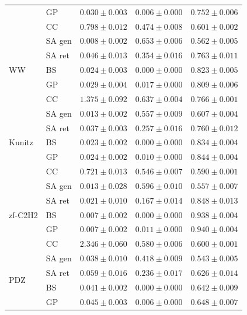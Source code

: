 \begin{table}[ht]
\begin{tabular}{@{}llccc@{}}
 & GP      & $\mathbf{0.030 \pm 0.003}$ & $0.006 \pm 0.000$ & $0.752 \pm 0.006$ \\
 & CC      & $0.798 \pm 0.012$ & $0.474 \pm 0.008$ & $0.601 \pm 0.002$ \\
\midrule
\multirow{5}{*}{WW}
 & SA gen  & $\mathbf{0.008 \pm 0.002}$ & $\mathbf{0.653 \pm 0.006}$ & $\mathbf{0.562 \pm 0.005}$ \\
 & SA ret  & $0.046 \pm 0.013$ & $0.354 \pm 0.016$ & $0.763 \pm 0.011$ \\
 & BS      & $0.024 \pm 0.003$ & $0.000 \pm 0.000$ & $0.823 \pm 0.005$ \\
 & GP      & $0.029 \pm 0.004$ & $0.017 \pm 0.000$ & $0.809 \pm 0.006$ \\
 & CC      & $1.375 \pm 0.092$ & $0.637 \pm 0.004$ & $0.766 \pm 0.001$ \\
\midrule
\multirow{5}{*}{Kunitz}
 & SA gen  & $\mathbf{0.013 \pm 0.002}$ & $\mathbf{0.557 \pm 0.009}$ & $\mathbf{0.607 \pm 0.004}$ \\
 & SA ret  & $0.037 \pm 0.003$ & $0.257 \pm 0.016$ & $0.760 \pm 0.012$ \\
 & BS      & $0.023 \pm 0.002$ & $0.000 \pm 0.000$ & $0.834 \pm 0.004$ \\
 & GP      & $0.024 \pm 0.002$ & $0.010 \pm 0.000$ & $0.844 \pm 0.004$ \\
 & CC      & $0.721 \pm 0.013$ & $0.546 \pm 0.007$ & $0.590 \pm 0.001$ \\
\midrule
\multirow{5}{*}{zf-C2H2}
 & SA gen  & $0.013 \pm 0.028$ & $\mathbf{0.596 \pm 0.010}$ & $\mathbf{0.557 \pm 0.007}$ \\
 & SA ret  & $0.021 \pm 0.010$ & $0.167 \pm 0.014$ & $0.848 \pm 0.013$ \\
 & BS      & $\mathbf{0.007 \pm 0.002}$ & $0.000 \pm 0.000$ & $0.938 \pm 0.004$ \\
 & GP      & $\mathbf{0.007 \pm 0.002}$ & $0.011 \pm 0.000$ & $0.940 \pm 0.004$ \\
 & CC      & $2.346 \pm 0.060$ & $0.580 \pm 0.006$ & $0.600 \pm 0.001$ \\
\midrule
\multirow{5}{*}{PDZ}
 & SA gen  & $\mathbf{0.038 \pm 0.010}$ & $\mathbf{0.418 \pm 0.009}$ & $\mathbf{0.543 \pm 0.005}$ \\
 & SA ret  & $0.059 \pm 0.016$ & $0.236 \pm 0.017$ & $0.626 \pm 0.014$ \\
 & BS      & $0.041 \pm 0.002$ & $0.000 \pm 0.000$ & $0.642 \pm 0.009$ \\
 & GP      & $0.045 \pm 0.003$ & $0.006 \pm 0.000$ & $0.648 \pm 0.007$ \\

\end{tabular}
\end{table}
